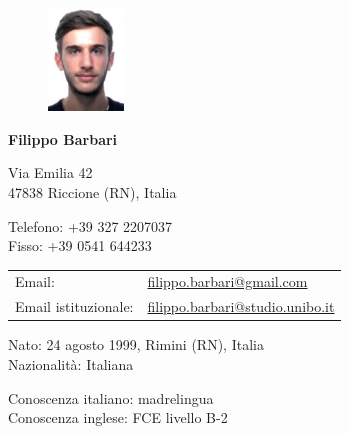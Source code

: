 \documentclass[curriculum-vitae]{subfiles}
\begin{document}
	\begin{figure}
		\includegraphics[width=0.18\textwidth]{fototessera}
	\end{figure}
	
	{\LARGE\bfseries Filippo Barbari} %
	\bigskip
	
	Via Emilia 42\\ %
	47838 Riccione (RN), Italia
	\medskip %
	
	Telefono: +39 327 2207037\\
	Fisso: +39 0541 644233
	\medskip
	
	\noindent
	\begin{tabular}{ll}
		Email: & \href{mailto:filippo.barbari@gmail.com}{filippo.barbari@gmail.com}\\
		Email istituzionale: & \href{mailto:filippo.barbari@studio.unibo.it}{filippo.barbari@studio.unibo.it}
	\end{tabular}
	\medskip
	
	Nato: 24 agosto 1999, Rimini (RN), Italia\\ %
	Nazionalità: Italiana %
	\medskip
	
	Conoscenza italiano: madrelingua\\
	Conoscenza inglese: FCE livello B-2
\end{document}

